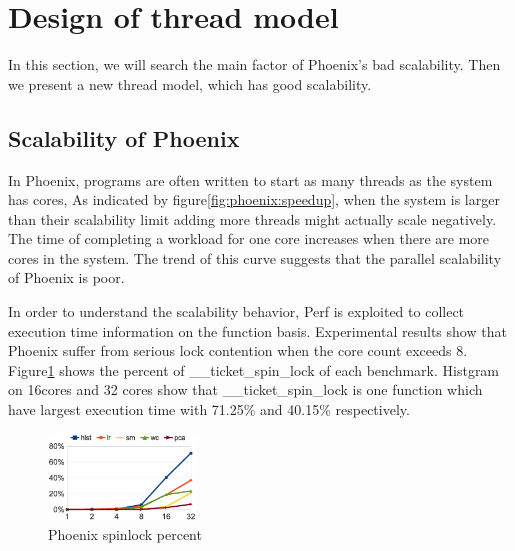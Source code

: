 \section{Design of thread model}
{\color{red}In this section, we will search the main factor of Phoenix's bad scalability.
Then we present a new thread model, which has good scalability.
}

\subsection{Scalability of Phoenix}
In Phoenix, programs are often written to start as many threads as the system has cores,
As indicated by figure\ref{fig:phoenix:speedup}, 
when the system is larger than their scalability limit 
adding more threads might actually scale negatively.
The time of completing a workload for one core increases 
when there are more cores in the system. 
The trend of this curve suggests that
the parallel scalability of Phoenix is poor.

In order to understand the scalability behavior, 
Perf\cite{} is exploited to collect execution time information
on the function basis. 
Experimental results show that Phoenix suffer from serious lock contention
when the core count exceeds 8.
Figure\ref{fig:phoenix:spinlock} shows the percent of \_\_ticket\_spin\_lock of each benchmark.
Histgram on 16cores and 32 cores
show that \_\_ticket\_spin\_lock is one function 
which have largest execution time with 71.25\% and 40.15\% respectively. 
\begin{figure}[!h!t]  
    \centering
    \includegraphics[width=0.35\textwidth]{eps/phoenix_spinlock.eps}
    \caption{Phoenix spinlock percent}
    \label{fig:phoenix:spinlock}
\end{figure}


